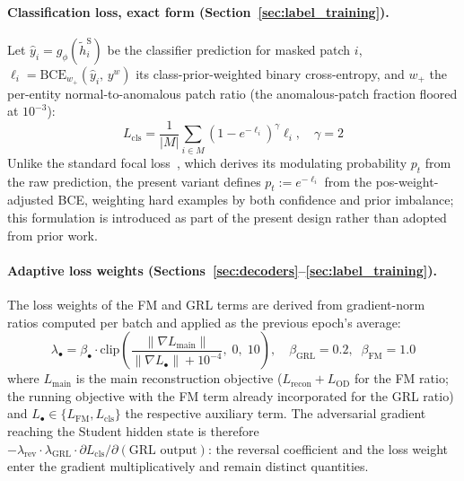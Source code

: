 \paragraph{Classification loss, exact form (Section~\ref{sec:label_training}).}
Let $\hat{y}_i = g_\phi(\tilde{h}^{\mathrm{S}}_i)$ be the classifier prediction for masked
patch $i$, $\ell_i = \mathrm{BCE}_{w_+}(\hat{y}_i,\, y^w)$ its class-prior-weighted binary
cross-entropy, and $w_+$ the per-entity normal-to-anomalous patch ratio (the anomalous-patch
fraction floored at $10^{-3}$):
\begin{equation}
  L_{\mathrm{cls}} = \frac{1}{|M|}
    \sum_{i \in M} \left(1 - e^{-\ell_i}\right)^{\!\gamma} \ell_i,
    \quad \gamma = 2
  \label{eq:lcls_app}
\end{equation}
Unlike the standard focal loss~\cite{lin2017focal}, which derives its modulating probability
$p_t$ from the raw prediction, the present variant defines $p_t := e^{-\ell_i}$ from the
pos-weight-adjusted BCE, weighting hard examples by both confidence and prior imbalance; this
formulation is introduced as part of the present design rather than adopted from prior work.

\paragraph{Adaptive loss weights (Sections~\ref{sec:decoders}--\ref{sec:label_training}).}
The loss weights of the FM and GRL terms are derived from gradient-norm ratios computed per
batch and applied as the previous epoch's average:
\begin{equation}
  \lambda_{\bullet} = \beta_{\bullet} \cdot \mathrm{clip}\!\left(
    \frac{\|\nabla L_{\mathrm{main}}\|}{\|\nabla L_{\bullet}\| + 10^{-4}},\;
    0,\; 10\right),
  \quad \beta_{\mathrm{GRL}} = 0.2,\;\; \beta_{\mathrm{FM}} = 1.0
  \label{eq:adaptive_weight}
\end{equation}
where $L_{\mathrm{main}}$ is the main reconstruction objective
($L_{\mathrm{recon}} + L_{\mathrm{OD}}$ for the FM ratio; the running objective with the
FM term already incorporated for the GRL ratio) and $L_{\bullet} \in \{L_{\mathrm{FM}},
L_{\mathrm{cls}}\}$ the respective auxiliary term.
The adversarial gradient reaching the Student hidden state is therefore
$-\lambda_{\mathrm{rev}} \cdot \lambda_{\mathrm{GRL}} \cdot
\partial L_{\mathrm{cls}} / \partial(\text{GRL output})$: the reversal coefficient and the loss
weight enter the gradient multiplicatively and remain distinct quantities.

